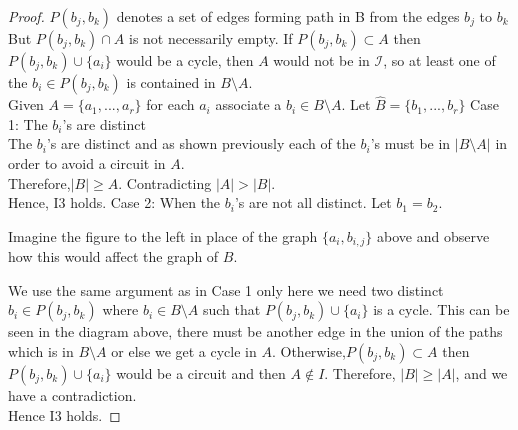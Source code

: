\documentclass[../main.tex]{subfiles}
\begin{document}
\begin{proof}
\begin{minipage}{.2\textwidth}
\begin{tikzpicture}
\end{tikzpicture}  
 \end{minipage}
 
 \vspace{2mm}
 
 \noindent\Notation $P( b_j, b_k )$ denotes a set of edges forming path in B from the edges $ b_j $ to $ b_k $
\noindent But $ P(b_j,b_k) \cap A $ is not necessarily empty. If $P(b_j,b_k) \subset A$ then $P(b_j,b_k) \cup \{ a_i \}$  would be a cycle, then $A$ would not be in $\mathcal{I}$, so at least one of the $b_i \in P(b_j,b_k)$ is contained in $B \setminus A.$\\
\noindent Given $A = \{a_1, ... ,a_r\} $ for each $a_i$ associate a $b_i \in B \setminus A$. Let $\hat{B} = \{b_1, ... ,b_r\}$ 
\noindent Case 1: The $ b_i$'s are distinct\\
 The $b_i$'s are distinct and as shown previously each of the $b_i$'s must be in $|B \setminus A|$ in order to avoid a circuit in $A$.\\ 
\noindent Therefore,$|B| \geqslant A$. Contradicting $|A|>|B|.$\\
\noindent Hence, I3 holds.
\noindent Case 2: When the $b_i$'s are not all distinct.
\noindent Let $ b_1 = b_2 $.

\vspace{3mm}

\begin{minipage}{.2\textwidth}
\end{minipage}
\hspace{2.5cm} \begin{minipage}{.6\textwidth}
Imagine the figure to the left in place of the graph $\{a_i, b_{i,j}\}$ above and observe how this would affect the graph of $B.$
 \end{minipage}
\noindent We use the same argument as in Case 1 only here we need two distinct $b_i \in P( b_j, b_k)$ where $b_i \in B \setminus A$ such that  $P(b_j , b_k ) \cup \{ a_i \}$ is a cycle. This can be seen in the diagram above, there must be another edge in the union of the paths which is in $B \setminus A$ or else we get a cycle in $A.$ Otherwise,$P(b_j,b_k) \subset A$ then $P(b_j,b_k) \cup \{ a_i \}$  would be a circuit and then $A \notin I.$ Therefore, $|B| \geq |A|$, and we have a contradiction.\\
\noindent Hence I3 holds.
\end{proof}
 
\end{document}
